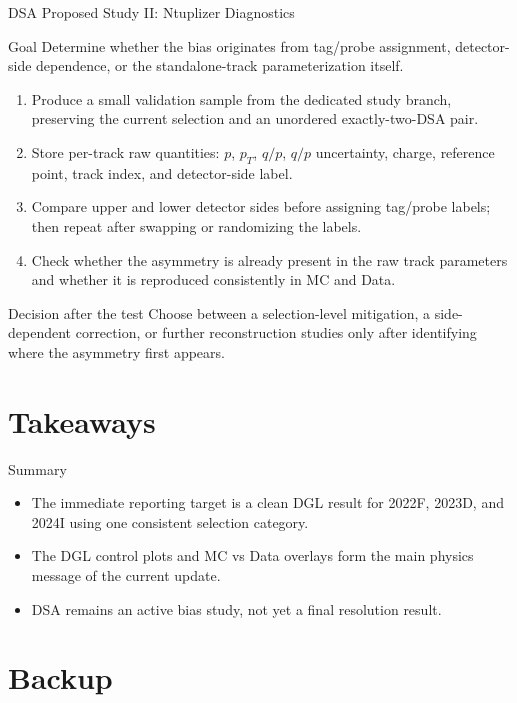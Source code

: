 \documentclass[aspectratio=169]{beamer}
\begin{document}
\begin{frame}{DSA Proposed Study II: Ntuplizer Diagnostics}
  \small
  \begin{block}{Goal}
    Determine whether the bias originates from tag/probe assignment, detector-side dependence, or the standalone-track parameterization itself.
  \end{block}
  \begin{enumerate}
    \item Produce a small validation sample from the dedicated study branch, preserving the current selection and an unordered exactly-two-DSA pair.
    \item Store per-track raw quantities: $p$, $p_{T}$, $q/p$, $q/p$ uncertainty, charge, reference point, track index, and detector-side label.
    \item Compare upper and lower detector sides before assigning tag/probe labels; then repeat after swapping or randomizing the labels.
    \item Check whether the asymmetry is already present in the raw track parameters and whether it is reproduced consistently in MC and Data.
  \end{enumerate}
  \begin{alertblock}{Decision after the test}
    Choose between a selection-level mitigation, a side-dependent correction, or further reconstruction studies only after identifying where the asymmetry first appears.
  \end{alertblock}
\end{frame}

\section{Takeaways}

\begin{frame}{Summary}
  \begin{itemize}
    \item The immediate reporting target is a clean DGL result for 2022F, 2023D, and 2024I using one consistent selection category.
    \item The DGL control plots and MC vs Data overlays form the main physics message of the current update.
    \item DSA remains an active bias study, not yet a final resolution result.
  \end{itemize}
\end{frame}

\appendix
\section{Backup}
\end{document}
